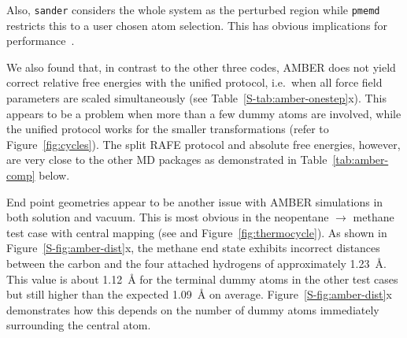 \documentclass[journal=jctcce,manuscript=article]{achemso}
\newcommand{\progname}[1]{\texttt{#1}}
\begin{document}
Also, \progname{sander} considers the whole system as the perturbed
region while \progname{pmemd} restricts this to a user chosen atom selection.
This has obvious implications for performance~\cite{doi:10.1021/ct400340s}.

We also found that, in contrast to the other three codes, AMBER does not yield
correct relative free energies with the unified protocol, i.e.\
when all force field parameters are scaled simultaneously (see
Table~\ref{S-tab:amber-onestep}x).
  This appears to be a problem when more than
a few dummy atoms are involved, while the unified protocol works for the
smaller transformations (refer to Figure~\ref{fig:cycles}).  The split RAFE
protocol and absolute free energies, however, are very close to the other MD
packages as demonstrated in Table~\ref{tab:amber-comp} below.

End point geometries appear to be another issue with AMBER simulations
in both solution and vacuum.  This is most obvious in the neopentane
$\rightarrow$ methane test case with central mapping (see
 and Figure~\ref{fig:thermocycle}).
As shown in Figure~\ref{S-fig:amber-dist}x, the methane end state exhibits
incorrect distances between the carbon and the four
attached hydrogens of approximately \SI{1.23}{\angstrom}.  This value is about
\SI{1.12}{\angstrom} for the terminal dummy atoms in the other test cases but
still higher than the expected \SI{1.09}{\angstrom} on average.
Figure~\ref{S-fig:amber-dist}x demonstrates how this depends on the number of
dummy atoms immediately surrounding the central atom.
\end{document}
